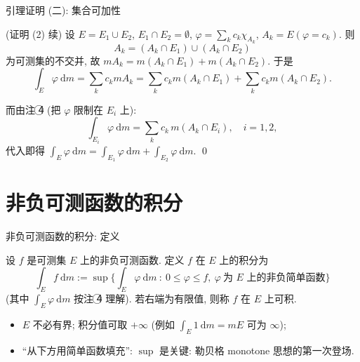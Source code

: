 
\begin{frame}{引理证明 (二): 集合可加性}

\startproof[bg=yellow, fg=red](证明 (2) 续)
设 $E = E_1 \cup E_2$, $E_1 \cap E_2 = \emptyset$, $\varphi = \sum_k c_k \chi_{A_k}$,
$A_k = E(\varphi = c_k)$. 则
\[
A_k = (A_k \cap E_1) \cup (A_k \cap E_2)
\]
为可测集的不交并, 故 $m A_k = m(A_k \cap E_1) + m(A_k \cap E_2)$. 于是
\[
\int_E \varphi ~ \mathrm{d} m
= \sum_k c_k m A_k
= \sum_k c_k m(A_k \cap E_1) + \sum_k c_k m(A_k \cap E_2) .
\]

\pause

而由注 \textcircled{4} (把 $\varphi$ 限制在 $E_i$ 上):
\[
\int_{E_i} \varphi ~ \mathrm{d} m = \sum_k c_k\, m(A_k \cap E_i), \quad i = 1, 2,
\]
代入即得 $\int_E \varphi ~ \mathrm{d} m = \int_{E_1} \varphi ~ \mathrm{d} m + \int_{E_2} \varphi ~ \mathrm{d} m$. \qed

\end{frame}


\section[非负可测]{非负可测函数的积分}


\begin{frame}{非负可测函数的积分: 定义}

\begin{Def}[非负可测函数的积分]
设 $f$ 是可测集 $E$ 上的\alert{非负}可测函数. 定义 $f$ 在 $E$ 上的积分为
\[
\int_E f ~ \mathrm{d} m
:= \sup \Big\{ \int_E \varphi ~ \mathrm{d} m \ :\ 0 \leqslant \varphi \leqslant f,\
\varphi\ \text{为 $E$ 上的非负简单函数} \Big\}
\]
(其中 $\int_E \varphi ~ \mathrm{d} m$ 按注 \textcircled{4} 理解). 若右端为有限值,
则称 $f$ 在 $E$ 上\alert{可积}.
\end{Def}

\pause

\begin{itemize}
\item $E$ 不必有界; 积分值可取 $+\infty$ (例如 $\int_E 1 ~ \mathrm{d} m = mE$ 可为 $\infty$);
\item ``从下方用简单函数填充'': $\sup$ 是关键: 勒贝格 monotone 思想的第一次登场.
\end{itemize}

\end{frame}

